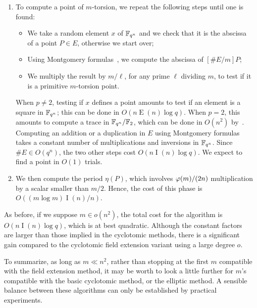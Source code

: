 \documentclass{article}
\DeclareMathOperator{\Ext}{E}
\DeclareMathOperator{\Inv}{I}
\begin{document}
\begin{enumerate}
\item To compute a point of $m$-torsion, we repeat the following steps
  until one is found:
  \begin{itemize}
  \item We take a random element $x$ of $\mathbb{F}_{q^n}$ and we check that
    it is the abscissa of a point $P\in E$, otherwise we start over;
  \item Using Montgomery formulas~\cite{}, we compute the abscissa of
    $[\#E/m]P$;
  \item We multiply the result by $m/\ell$, for any prime $\ell$
    dividing $m$, to test if it is a primitive $m$-torsion point.
  \end{itemize}
  When $p\ne2$, testing if $x$ defines a point amounts to test if an
  element is a square in $\mathbb{F}_{q^n}$; this can be done in
  $O(n\Ext(n)\log q)$. When $p=2$, this amounts to compute a trace in
  $\mathbb{F}_{q^n}/\mathbb{F}_2$, which can be done in $O(n^2)$ by~\cite{}. Computing
  an addition or a duplication in $E$ using Montgomery formulas takes
  a constant number of multiplications and inversions in $\mathbb{F}_{q^n}$.
  Since $\#E\in O(q^n)$, the two other steps cost $O(n\Inv(n)\log
  q)$. We expect to find a point in $O(1)$ trials.
\item We then compute the period $\eta(P)$, which involves
  $\varphi(m)/(2n)$ multiplication by a scalar smaller than
  $m/2$. Hence, the cost of this phase is $O((m\log m)\Inv(n)/n)$.  
\end{enumerate}

As before, if we suppose $m\in o(n^2)$, the total cost for the
algorithm is $O(n\Inv(n)\log q)$, which is at best quadratic. Although
the constant factors are larger than those implied in the cyclotomic
methods, there is a significant gain compared to the cyclotomic field
extension variant using a large degree $o$.

To summarize, as long as $m\ll n^2$, rather than stopping at the first
$m$ compatible with the field extension method, it may be worth to
look a little further for $m$'s compatible with the basic cyclotomic
method, or the elliptic method. A sensible balance between these
algorithms can only be established by practical experiments.
\end{document}
